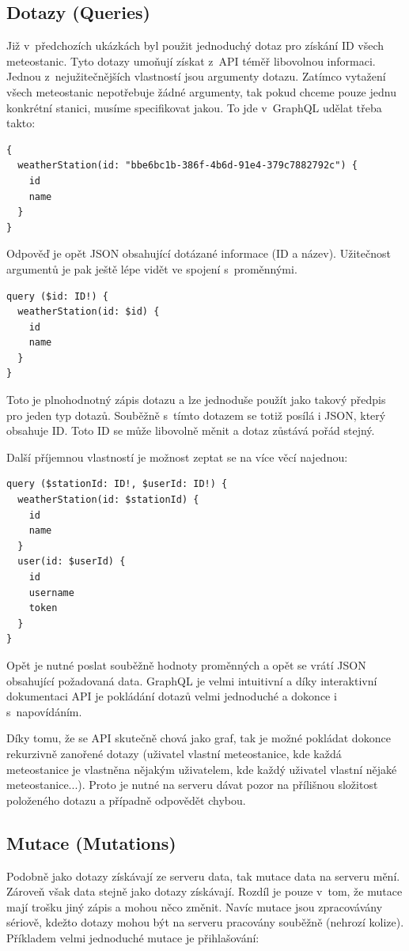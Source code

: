\subsection{Dotazy (Queries)}
Již v~předchozích ukázkách byl použit jednoduchý dotaz pro získání ID všech meteostanic. Tyto dotazy umoňují získat z~API téměř libovolnou informaci. Jednou z~nejužitečnějších vlastností jsou argumenty dotazu. Zatímco vytažení všech meteostanic nepotřebuje žádné argumenty, tak pokud chceme pouze jednu konkrétní stanici, musíme specifikovat jakou. To jde v~GraphQL udělat třeba takto:

\begin{verbatim}
{
  weatherStation(id: "bbe6bc1b-386f-4b6d-91e4-379c7882792c") {
    id
    name
  }
}
\end{verbatim}
%
Odpověď je opět JSON obsahující dotázané informace (ID a název). Uži\-teč\-nost argumentů je pak ještě lépe vidět ve spojení s~proměnnými. 
%
\begin{verbatim}
query ($id: ID!) {
  weatherStation(id: $id) {
    id
    name
  }
}
\end{verbatim}

Toto je plnohodnotný zápis dotazu a lze jednoduše použít jako takový předpis pro jeden typ dotazů. Souběžně s~tímto dotazem se totiž posílá i JSON, který obsahuje ID. Toto ID se může libovolně měnit a dotaz zůstává pořád stejný.

Další příjemnou vlastností je možnost zeptat se na více věcí najednou:

\begin{verbatim}
query ($stationId: ID!, $userId: ID!) {
  weatherStation(id: $stationId) {
    id
    name
  }
  user(id: $userId) {
    id
    username
    token
  }
}
\end{verbatim}

Opět je nutné poslat souběžně hodnoty proměnných a opět se vrátí JSON obsahující požadovaná data. GraphQL je velmi intuitivní a díky interaktivní dokumentaci API je pokládání dotazů velmi jednoduché a dokonce i s~napovídáním.

Díky tomu, že se API skutečně chová jako graf, tak je možné pokládat dokonce rekurzivně zanořené dotazy (uživatel vlastní meteostanice, kde každá meteostanice je vlastněna nějakým uživatelem, kde každý uživatel vlastní nějaké meteostanice...). Proto je nutné na serveru dávat pozor na přílišnou složitost položeného dotazu a případně odpovědět chybou.

\subsection{Mutace (Mutations)}
Podobně jako dotazy získávají ze serveru data, tak mutace data na serveru mění. Zároveň však data stejně jako dotazy získávají. Rozdíl je pouze v~tom, že mutace mají trošku jiný zápis a mohou něco změnit. Navíc mutace jsou zpracovávány sériově, kdežto dotazy mohou být na serveru pracovány souběžně (nehrozí kolize). Příkladem velmi jednoduché mutace je přihlašování:

